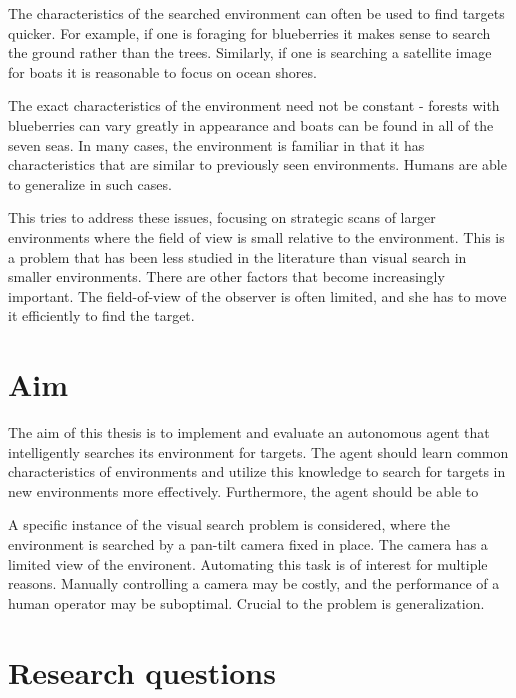 The characteristics of the searched environment can often be used to find targets quicker. For example, if one is foraging for blueberries it makes sense to search the ground rather than the trees. Similarly, if one is searching a satellite image for boats it is reasonable to focus on ocean shores.

The exact characteristics of the environment need not be constant - forests with blueberries can vary greatly in appearance and boats can be found in all of the seven seas. In many cases, the environment is familiar in that it has characteristics that are similar to previously seen environments. Humans are able to generalize in such cases.


This tries to address these issues, focusing on strategic scans of larger environments where the field of view is small relative to the environment. This is a problem that has been less studied in the literature than visual search in smaller environments. There are other factors that become increasingly important. The field-of-view of the observer is often limited, and she has to move it efficiently to find the target.


\section{Aim}
\label{sec:aim}

The aim of this thesis is to implement and evaluate an autonomous agent that intelligently searches its environment for targets. The agent should learn common characteristics of environments and utilize this knowledge to search for targets in new environments more effectively. Furthermore, the agent should be able to 

A specific instance of the visual search problem is considered, where the environment is searched by a pan-tilt camera fixed in place. The camera has a limited view of the environent. Automating this task is of interest for multiple reasons. Manually controlling a camera may be costly, and the performance of a human operator may be suboptimal. Crucial to the problem is generalization.

\section{Research questions}
\label{sec:research-questions}

